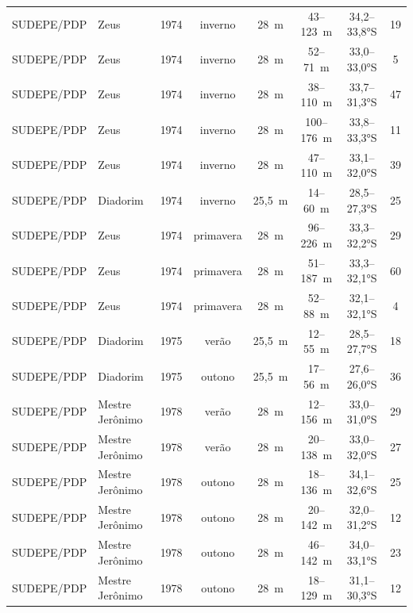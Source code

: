 \documentclass[a4paper,11pt,twoside,showtrims,onecolumn,openright,final]{memoir}
\begin{document}
\begin{table}
\begin{tiny}
\begin{tabular*}{\textwidth}{l@{\extracolsep{\fill}}lcccccc}
 SUDEPE/PDP	&	Zeus             & 1974 &         inverno &      28~m &      43--123~m &   34,2--33,8°S &          19 	\\
 SUDEPE/PDP	&	Zeus             & 1974 &         inverno &      28~m &      52--71~m &   33,0--33,0°S &           5 	\\
 SUDEPE/PDP	&	Zeus             & 1974 &         inverno &      28~m &      38--110~m &   33,7--31,3°S &          47 	\\
 SUDEPE/PDP	&	Zeus             & 1974 &         inverno &      28~m &     100--176~m &   33,8--33,3°S &          11 	\\
 SUDEPE/PDP	&	Zeus             & 1974 &         inverno &      28~m &      47--110~m &   33,1--32,0°S &          39 	\\
 SUDEPE/PDP	&	Diadorim         & 1974 &         inverno &    25,5~m &      14--60~m &   28,5--27,3°S &          25 	\\
 SUDEPE/PDP	&	Zeus             & 1974 &         primavera &      28~m &      96--226~m &   33,3--32,2°S &          29 	\\
 SUDEPE/PDP	&	Zeus             & 1974 &         primavera &      28~m &      51--187~m &   33,3--32,1°S &          60 	\\
 SUDEPE/PDP	&	Zeus             & 1974 &         primavera &      28~m &      52--88~m &   32,1--32,1°S &           4 		\\
 SUDEPE/PDP	&	Diadorim         & 1975 &         verão &    25,5~m &      12--55~m &   28,5--27,7°S &          18 	\\
 SUDEPE/PDP	&	Diadorim         & 1975 &         outono &    25,5~m &      17--56~m &   27,6--26,0°S &          36 	\\
 SUDEPE/PDP	&	Mestre Jerônimo  & 1978 &         verão &      28~m &      12--156~m &   33,0--31,0°S &          29 	\\
 SUDEPE/PDP	&	Mestre Jerônimo  & 1978 &         verão &      28~m &      20--138~m &   33,0--32,0°S &          27 	\\
 SUDEPE/PDP	&	Mestre Jerônimo  & 1978 &         outono &      28~m &      18--136~m &   34,1--32,6°S &          25 	\\
 SUDEPE/PDP	&	Mestre Jerônimo  & 1978 &         outono &      28~m &      20--142~m &   32,0--31,2°S &          12 	\\
 SUDEPE/PDP	&	Mestre Jerônimo  & 1978 &         outono &      28~m &      46--142~m &   34,0--33,1°S &          23 	\\
 SUDEPE/PDP	&	Mestre Jerônimo  & 1978 &         outono &      28~m &      18--129~m &   31,1--30,3°S &          12 	\\

\end{tabular*}
\end{tiny}
\end{table}
\end{document}
